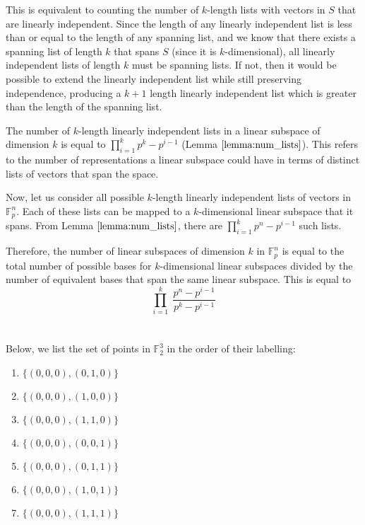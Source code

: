 \documentclass{article}
\newcommand{\F}{\mathbb{F}}
\begin{document}
This is equivalent to counting the number of $k$-length lists with vectors in $S$ that are linearly independent. Since the length of any linearly independent list is less than or equal to the length of any spanning list, and we know that there exists a spanning list of length $k$ that spans $S$ (since it is $k$-dimensional), all linearly independent lists of length $k$ must be spanning lists. If not, then it would be possible to extend the linearly independent list while still preserving independence, producing a $k + 1$ length linearly independent list which is greater than the length of the spanning list.

The number of $k$-length linearly independent lists in a linear subspace of dimension $k$ is equal to $\prod _{i = 1} ^{k} p^k - p^{i - 1}$ (Lemma $\ref{lemma:num_lists}$). This refers to the number of representations a linear subspace could have in terms of distinct lists of vectors that span the space.

Now, let us consider all possible $k$-length linearly independent lists of vectors in $\F_p^n$. Each of these lists can be mapped to a $k$-dimensional linear subspace that it spans. From Lemma $\ref{lemma:num_lists}$, there are $\prod _{i = 1} ^{k} p^n - p^{i - 1}$ such lists.

Therefore, the number of linear subspaces of dimension $k$ in $\F_p^n$ is equal to the total number of possible bases for $k$-dimensional linear subspaces divided by the number of equivalent bases that span the same linear subspace. This is equal to \[\prod_{i=1}^k \; \frac{p^n - p^{i - 1}}{p^k - p^{i-1}}\]

\newpage
\section{}

Below, we list the set of points in $\F_2^3$ in the order of their labelling:

\begin{enumerate}
    \item $\{(0, 0, 0), (0, 1, 0)\}$
    \item $\{(0, 0, 0), (1, 0, 0)\}$
    \item $\{(0, 0, 0), (1, 1, 0)\}$
    \item $\{(0, 0, 0), (0, 0, 1)\}$
    \item $\{(0, 0, 0), (0, 1, 1)\}$
    \item $\{(0, 0, 0), (1, 0, 1)\}$
    \item $\{(0, 0, 0), (1, 1, 1)\}$
\end{enumerate}
\end{document}
